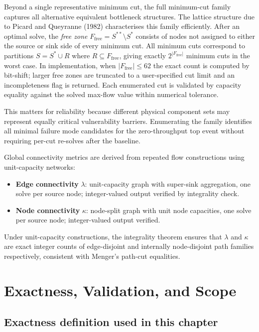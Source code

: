 \documentclass[12pt]{report}
\begin{document}
Beyond a single representative minimum cut, the full minimum-cut family captures all alternative equivalent bottleneck structures. The lattice structure due to Picard and Queyranne (1982) characterises this family efficiently. After an optimal solve, the \emph{free zone} $F_{\mathrm{free}} = S^{**}\setminus S^*$ consists of nodes not assigned to either the source or sink side of every minimum cut. All minimum cuts correspond to partitions $S = S^* \cup R$ where $R\subseteq F_{\mathrm{free}}$, giving exactly $2^{|F_{\mathrm{free}}|}$ minimum cuts in the worst case. In implementation, when $|F_{\mathrm{free}}|\le 62$ the exact count is computed by bit-shift; larger free zones are truncated to a user-specified cut limit and an incompleteness flag is returned. Each enumerated cut is validated by capacity equality against the solved max-flow value within numerical tolerance.

This matters for reliability because different physical component sets may represent equally critical vulnerability barriers. Enumerating the family identifies all minimal failure mode candidates for the zero-throughput top event without requiring per-cut re-solves after the baseline.

Global connectivity metrics are derived from repeated flow constructions using unit-capacity networks:
\begin{itemize}
    \item \textbf{Edge connectivity} $\lambda$: unit-capacity graph with super-sink aggregation, one solve per source node; integer-valued output verified by integrality check.
    \item \textbf{Node connectivity} $\kappa$: node-split graph with unit node capacities, one solve per source node; integer-valued output verified.
\end{itemize}
Under unit-capacity constructions, the integrality theorem ensures that $\lambda$ and $\kappa$ are exact integer counts of edge-disjoint and internally node-disjoint path families respectively, consistent with Menger's path-cut equalities.

\section{Exactness, Validation, and Scope}

\subsection{Exactness definition used in this chapter}
\end{document}
